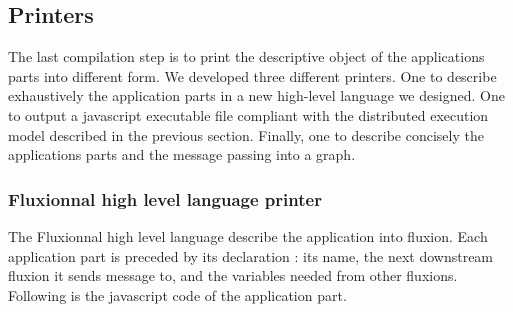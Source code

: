 









\subsection{Printers}

The last compilation step is to print the descriptive object of the applications parts into different form.
We developed three different printers.
One to describe exhaustively the application parts in a new high-level language we designed.
One to output a javascript executable file compliant with the distributed execution model described in the previous section.
Finally, one to describe concisely the applications parts and the message passing into a graph. 


\subsubsection{Fluxionnal high level language printer}

The Fluxionnal high level language describe the application into fluxion.
Each application part is preceded by its declaration : its name, the next downstream fluxion it sends message to, and the variables needed from other fluxions.
Following is the javascript code of the application part.

